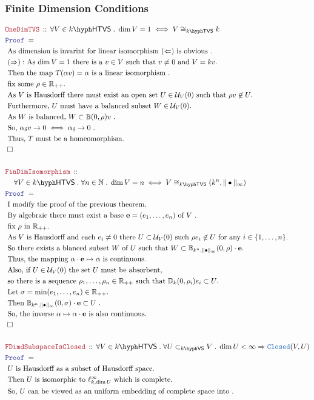 \documentclass[12pt]{scrartcl}
\newcommand{\TYPE}[1]{\textcolor{NavyBlue}{\mathtt{#1}}}
\newcommand{\LOGIC}[1]{\textcolor{Blue}{\mathtt{#1}}}
\newcommand{\THM}[1]{\textcolor{Maroon}{\mathtt{#1}}}
\renewcommand{\.}{\; . \;}
\newcommand{\Theorem}[2]{& \THM{#1} \, :: \, #2 \\ & \Proof = \\ }
\newcommand{\NewLine}{\\ & \kern 1pc}
\newcommand{\Page}[1]{ \begin{align*} #1 \end{align*}   }
\newcommand{\Explain}[1]{& \text{#1.} \\}
\newcommand{\ExplainFurther}[1]{& \text{#1} \\}
\newcommand{\Imply}{\Rightarrow}
\newcommand{\Reals}{\mathbb{R} }
\newcommand{\Nat}{\mathbb{N} }
\newcommand{\QED}{\; \square}
\newcommand{\EndProof}{& \QED \\}
\newcommand{\Proof}{\LOGIC{Proof} \; }
\newcommand{\Closed}{\TYPE{Closed}}
\renewcommand{\U}{\mathcal{U}}
\newcommand{\Cell}{\mathbb{B}}
\newcommand{\Disc}{\mathbb{D}}
\newcommand{\subvec}[1]{\subset_{\VS{#1}}}%
\newcommand{\VS}[1]{#1\hyph\mathsf{VS}} %
\newcommand{\TVS}[1]{{#1}\hyph\mathsf{TVS}}
\newcommand{\HTVS}[1]{{#1}\hyph\mathsf{HTVS}}
\begin{document}
\subsubsection{Finite Dimension Conditions}
\Page{
	\Theorem{OneDimTVS}
	{
		\forall V \in \HTVS{k} \.
		\dim V = 1 \iff V \cong_{\TVS{k}} k
	}
	\Explain{
		As dimension is invarint for linear isomorphism $(\Leftarrow)$ is obvious }
	\Explain{
		$(\Rightarrow):$ As $\dim V = 1$ there is a $v \in V$ such that $v \neq 0$ 
		and $V = kv$}
	\Explain{ 
		Then the map	$T(\alpha v) = \alpha$ is a linear isomorphism
	}
	\Explain{
		fix some $\rho \in \Reals_{++}$}
	\Explain{
		As $V$ is Hausdorff there must exist 
		an open set $U \in \U_V(0)$ such that $\rho v \not \in U$}
	\Explain{
		Furthermore, $U$ must have a balanced subset 
		$W \in \U_V(0)$}
	\Explain{
		As $W$ is balanced, $W \subset \Cell(0,\rho)v$
	}
	\Explain{
		So,  $\alpha_\delta v \to 0 \iff \alpha_\delta \to 0$ 
	}
	\Explain{
		Thus, $T$ must be a homeomorphism}
	\EndProof
	\\
	\Theorem{FinDimIsomorphism}
	{
		\NewLine		
		\forall V \in \HTVS{k} \. \forall n \in \Nat \.
		\dim V = n \iff V \cong_{\TVS{k}} (k^n,\|\bullet\|_\infty)
	}
	\Explain{
		I modify the proof of the previous theorem}
	\Explain{
		By algebraic there must exist a base $\mathbf{e} = (e_1,\ldots, e_n)$ of $V$
	}
	\Explain{
		fix $\rho$ in $\Reals_{++}$}
	\Explain{
		As $V$ is Hausdorff and each $e_i \neq 0$ there 
		$U \subset \U_V(0)$ such $\rho e_i \not \in U$ for any $i \in \{1,\ldots,n\}$}
	\Explain{
		So there exists a blanced subset $W$ of $U$ such that
		$W \subset \Cell_{k^n,\|\bullet\|_\infty}(0,\rho)\cdot \mathbf{e}$}
	\Explain{
		Thus, the mapping $\mathbf{\alpha \cdot e} \mapsto \mathbf{\alpha}$
		is continuous}
	\ExplainFurther{
		Also, if $U \in \U_V(0)$ the set $U$ must be absorbent,}
	\Explain{ so there is a sequence $\rho_1,\ldots,\rho_n \in \Reals_{++}$ such that
		$\Disc_k(0,\rho_i) e_i \subset U$}
	\Explain{
		Let $\sigma = \min(e_1,\ldots,e_n) \in \Reals_{++}$}
	\Explain{
		Then $\Cell_{k^n,\|\bullet\|_\infty}(0,\sigma) \cdot \mathbf{e} \subset U$
	}
	\Explain{
		So, the inverse $\alpha \mapsto \alpha \cdot \mathbf{e}$ is also continuous}
	\EndProof
	\\
	\Theorem{FDimdSubspaceIsClosed}
	{
			\forall V \in \HTVS{k} \.
			\forall U \subvec{k} V \.
			\dim U  < \infty \Imply \Closed(V,U)
	}
	\Explain{ 
		$U$ is Hausdorff as a subset of Hausdorff space}
	\Explain{
		Then $U$ is isomorphic to $\ell^\infty_{k,\dim U}$ which is complete}
	\Explain{
		So, $U$ can be viewed as an uniform embedding of complete space into
}}
\end{document}
